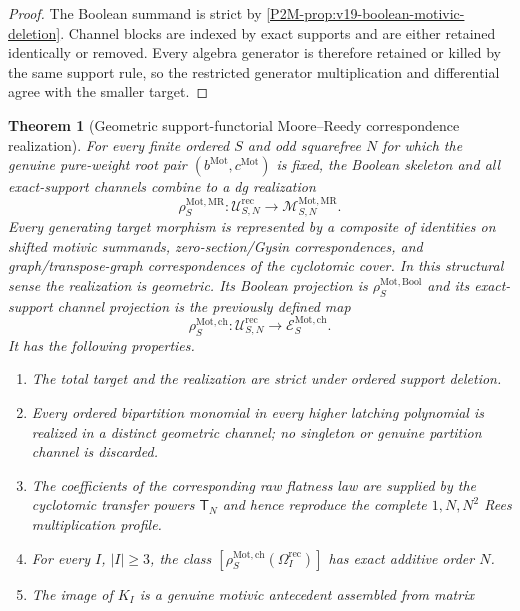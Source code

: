 \documentclass[11pt]{article}
\newtheorem{theorem}{Theorem}[section]
\theoremstyle{remark}
\newcommand{\Mot}{\mathrm{Mot}}
\newcommand{\MR}{\mathrm{MR}}
\begin{document}
\begin{proof}
The Boolean summand is strict by
\cref{P2M-prop:v19-boolean-motivic-deletion}.  Channel blocks are indexed by exact
supports and are either retained identically or removed.  Every algebra
generator is therefore retained or killed by the same support rule, so the
restricted generator multiplication and differential agree with the smaller
target.
\end{proof}

\begin{theorem}[Geometric support-functorial Moore--Reedy correspondence realization]
\label{P2M-thm:channel-complete-realization}
For every finite ordered $S$ and odd squarefree $N$ for which the genuine
pure-weight root pair $(b^{\Mot},c^{\Mot})$ is fixed, the Boolean skeleton and
all exact-support channels combine to a dg realization
\begin{equation}\label{P2M-eq:v19-total-motivic-realization}
 \boxed{
 \rho_S^{\Mot,\MR}:
 \mathscr U^{\mathrm{rec}}_{S,N}
 \longrightarrow
 \mathscr M_{S,N}^{\Mot,\MR}.}
\end{equation}
Every generating target morphism is represented by a composite of identities on shifted motivic summands, zero-section/Gysin correspondences, and graph/transpose-graph correspondences of the cyclotomic cover.  In this structural sense the realization is geometric.  Its Boolean projection is $\rho_S^{\Mot,\mathrm{Bool}}$ and its exact-support
channel projection is the previously defined map
\[
 \rho_S^{\Mot,\mathrm{ch}}:
 \mathscr U^{\mathrm{rec}}_{S,N}
 \longrightarrow
 \mathscr E_S^{\Mot,\mathrm{ch}}.
\]
It has the following properties.
\begin{enumerate}[label=\textup{(\roman*)}]
\item The total target and the realization are strict under ordered support deletion.
\item Every ordered bipartition monomial in every higher latching polynomial is
realized in a distinct geometric channel; no singleton or genuine partition
channel is discarded.
\item The coefficients of the corresponding raw flatness law are supplied by
the cyclotomic transfer powers $\mathsf T_N$ and hence reproduce the complete
$1,N,N^2$ Rees multiplication profile.
\item For every $I$, $|I|\ge3$, the class
$[\rho_S^{\Mot,\mathrm{ch}}(\Omega_I^{\mathrm{rec}})]$ has exact additive
order $N$.
\item The image of $K_I$ is a genuine motivic antecedent assembled from matrix

\end{enumerate}
\end{theorem}
\end{document}
